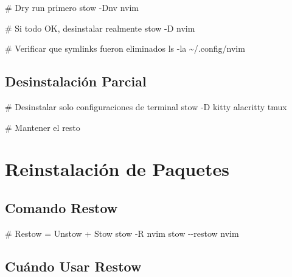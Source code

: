 \documentclass[
  doc,
  floatsintext,
  longtable,
  a4paper,
  nolmodern,
  notxfonts,
  notimes,
  12pt,
  colorlinks=true,linkcolor=blue,citecolor=blue,urlcolor=blue]{apa7}
\newenvironment{Shaded}{\begin{snugshade}}{\end{snugshade}}
\newcommand{\AttributeTok}[1]{\textcolor[rgb]{0.40,0.45,0.13}{#1}}
\newcommand{\CommentTok}[1]{\textcolor[rgb]{0.37,0.37,0.37}{#1}}
\newcommand{\ExtensionTok}[1]{\textcolor[rgb]{0.00,0.23,0.31}{#1}}
\newcommand{\FunctionTok}[1]{\textcolor[rgb]{0.28,0.35,0.67}{#1}}
\newcommand{\NormalTok}[1]{\textcolor[rgb]{0.00,0.23,0.31}{#1}}
\begin{document}
\begin{Shaded}
\begin{Highlighting}[]
\CommentTok{\# Dry run primero}
\ExtensionTok{stow} \AttributeTok{{-}Dnv}\NormalTok{ nvim}

\CommentTok{\# Si todo OK, desinstalar realmente}
\ExtensionTok{stow} \AttributeTok{{-}D}\NormalTok{ nvim}

\CommentTok{\# Verificar que symlinks fueron eliminados}
\FunctionTok{ls} \AttributeTok{{-}la}\NormalTok{ \textasciitilde{}/.config/nvim}
\end{Highlighting}
\end{Shaded}

\subsection{Desinstalación Parcial}\label{desinstalaciuxf3n-parcial}

\begin{Shaded}
\begin{Highlighting}[]
\CommentTok{\# Desinstalar solo configuraciones de terminal}
\ExtensionTok{stow} \AttributeTok{{-}D}\NormalTok{ kitty alacritty tmux}

\CommentTok{\# Mantener el resto}
\end{Highlighting}
\end{Shaded}

\section{Reinstalación de Paquetes}\label{reinstalaciuxf3n-de-paquetes}

\subsection{Comando Restow}\label{comando-restow}

\begin{Shaded}
\begin{Highlighting}[]
\CommentTok{\# Restow = Unstow + Stow}
\ExtensionTok{stow} \AttributeTok{{-}R}\NormalTok{ nvim}
\ExtensionTok{stow} \AttributeTok{{-}{-}restow}\NormalTok{ nvim}
\end{Highlighting}
\end{Shaded}

\subsection{Cuándo Usar Restow}\label{cuuxe1ndo-usar-restow}
\end{document}
